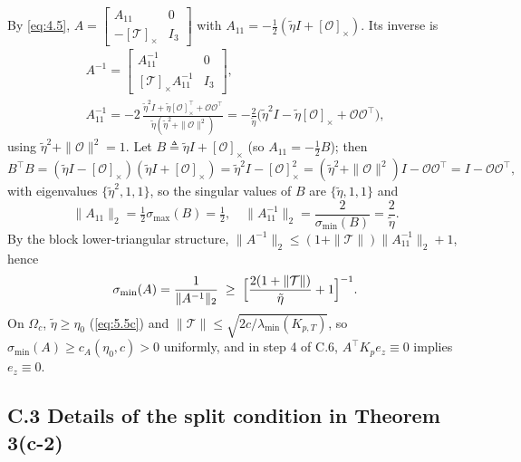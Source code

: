 By \eqref{eq:4.5}, $A=\begin{bmatrix}A_{11}&0\\ -[\mathcal T]_\times& I_3\end{bmatrix}$ with $A_{11}=-\tfrac12(\tilde\eta I+[\mathcal O]_\times)$. Its inverse is
\begin{equation*}
\begin{gathered}
A^{-1}=\begin{bmatrix}A_{11}^{-1}&0\\ [\mathcal T]_\times A_{11}^{-1}& I_3\end{bmatrix},\\[2pt]
A_{11}^{-1}=-2\,\frac{\tilde\eta^2I+\tilde\eta[\mathcal O]_\times^{\top}+\mathcal O\mathcal O^\top}{\tilde\eta(\tilde\eta^2+\|\mathcal O\|^2)}
=-\frac2{\tilde\eta}\bigl(\tilde\eta^2I-\tilde\eta[\mathcal O]_\times+\mathcal O\mathcal O^\top\bigr),
\end{gathered}
\end{equation*}
using $\tilde\eta^2+\|\mathcal O\|^2=1$. Let $B\triangleq\tilde\eta I+[\mathcal O]_\times$ (so $A_{11}=-\tfrac12B$); then
\begin{equation*}
B^\top B=(\tilde\eta I-[\mathcal O]_\times)(\tilde\eta I+[\mathcal O]_\times)=\tilde\eta^2I-[\mathcal O]_\times^2=(\tilde\eta^2+\|\mathcal O\|^2)I-\mathcal O\mathcal O^\top=I-\mathcal O\mathcal O^\top ,
\end{equation*}
with eigenvalues $\{\tilde\eta^2,1,1\}$, so the singular values of $B$ are $\{\tilde\eta,1,1\}$ and
\begin{equation*}
\|A_{11}\|_2=\tfrac12\sigma_{\max}(B)=\tfrac12 ,
\quad
\|A_{11}^{-1}\|_2=\frac2{\sigma_{\min}(B)}=\frac2{\tilde\eta} .
\end{equation*}
By the block lower-triangular structure, $\|A^{-1}\|_2\le(1+\|\mathcal T\|)\|A_{11}^{-1}\|_2+1$, hence
\begin{equation*}
\sigma_{\min}(A)=\frac1{\|A^{-1}\|_2}\;\ge\;\Bigl[\frac{2(1+\|\mathcal T\|)}{\tilde\eta}+1\Bigr]^{-1} .
\end{equation*}
On $\Omega_c$, $\tilde\eta\ge\eta_0$ (\eqref{eq:5.5c}) and $\|\mathcal T\|\le\sqrt{2c/\lambda_{\min}(K_{p,T})}$, so $\sigma_{\min}(A)\ge c_A(\eta_0,c)>0$ uniformly, and in step 4 of C.6, $A^\top K_pe_z\equiv0$ implies $e_z\equiv0$.

\subsection*{C.3 Details of the split condition in Theorem 3(c-2)}

